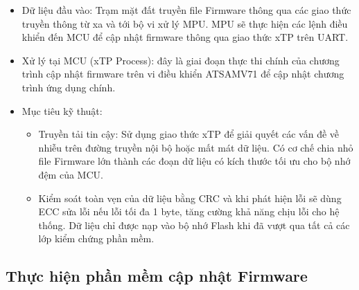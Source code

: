 \begin{itemize}

\item Dữ liệu đầu vào: Trạm mặt đất truyền file Firmware thông qua các giao thức truyền thông từ xa và tới bộ vi xử lý MPU. MPU sẽ thực hiện các lệnh điều khiển đến MCU để cập nhật firmware thông qua giao thức xTP trên UART.
\item Xử lý tại MCU (xTP Process): đây là giai đoạn thực thi chính của chương trình cập nhật firmware trên vi điều khiển ATSAMV71 để cập nhật chương trình ứng dụng chính.
\item Mục tiêu kỹ thuật:
    \begin{itemize}
        \item Truyền tải tin cậy: Sử dụng giao thức xTP để giải quyết các vấn đề về nhiễu trên đường truyền nội bộ hoặc mất mát dữ liệu. Có cơ chế chia nhỏ file Firmware lớn thành các đoạn dữ liệu có kích thước tối ưu cho bộ nhớ đệm của MCU.
        \item Kiểm soát toàn vẹn của dữ liệu bằng CRC và khi phát hiện lỗi sẽ dùng ECC sửa lỗi nếu lỗi tối đa 1 byte, tăng cường khả năng chịu lỗi cho hệ thống. Dữ liệu chỉ được nạp vào bộ nhớ Flash khi đã vượt qua tất cả các lớp kiểm chứng phần mềm.
    \end{itemize}
        
\end{itemize}



\subsection{Thực hiện phần mềm cập nhật Firmware}
\label{sec:thuc_hien_phan_mem_Bootloader}

